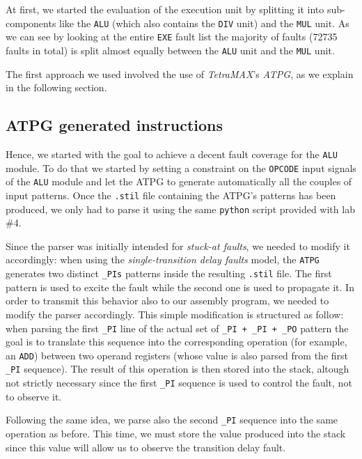 \documentclass{article}
\begin{document}
At first, we started the evaluation of the execution unit by splitting it into sub-components like the \texttt{ALU} (which also contains the \texttt{DIV} unit) and the \texttt{MUL} unit.
As we can see by looking at the entire \texttt{EXE} fault list the majority of faults (72735 faults in total) is split almost equally between the \texttt{ALU} unit and the \texttt{MUL} unit.

The first approach we used involved the use of \emph{TetraMAX}'s \emph{ATPG}, as we explain in the following section.

%
%

\subsection{ATPG generated instructions}
Hence, we started with the goal to achieve a decent fault coverage for the \texttt{ALU} module. To do that we started by setting a constraint on the \texttt{OPCODE} input signals of the \texttt{ALU} module and let the ATPG to generate automatically all the couples of input patterns. Once the \texttt{.stil} file containing the ATPG's patterns has been produced, we only had to parse it using the same \texttt{python} script provided with lab \#4.

Since the parser was initially intended for \emph{stuck-at faults}, we needed to modify it accordingly: when using the \emph{single-transition delay faults} model, the \texttt{ATPG} generates two distinct \texttt{\_PIs} patterns inside the resulting \texttt{.stil} file. The first pattern is used to excite the fault while the second one is used to propagate it. In order to transmit this behavior also to our assembly program, we needed to modify the parser accordingly. This simple modification is structured as follow: when parsing the first \texttt{\_PI} line of the actual set of \texttt{\_PI + \_PI + \_PO} pattern the goal is to translate this sequence into the corresponding operation (for example, an \texttt{ADD}) between two operand registers (whose value is also parsed from the first \texttt{\_PI} sequence).
The result of this operation is then stored into the stack, altough not strictly necessary since the first \texttt{\_PI} sequence is used to control the fault, not to observe it.

Following the same idea, we parse also the second \texttt{\_PI} sequence into the same operation as before. This time, we must store the value produced into the stack since this value will allow us to observe the transition delay fault.
\end{document}
